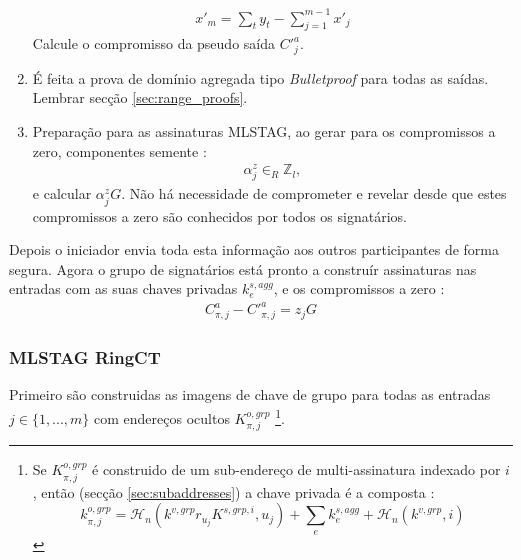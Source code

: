 \begin{enumerate}
\begin{align*}
x'_m = \sum_t y_t - \sum_{j=1}^{m-1} x'_j
\end{align*}
Calcule o compromisso da pseudo saída $C'^a_{j}$.
    \item É feita a prova de domínio agregada tipo {\em Bulletproof} para todas as saídas. Lembrar secção \ref{sec:range_proofs}. 
    \item Preparação para as assinaturas MLSTAG, ao gerar para os compromissos a zero, componentes semente :
\begin{align*}    
\alpha^z_{j} \in_R \mathbb{Z}_l ,
\end{align*}
e calcular $\alpha^z_{j} G$. Não há necessidade de comprometer e revelar desde que estes compromissos a zero são conhecidos por todos os signatários.
\end{enumerate}

Depois o iniciador envia toda esta informação aos outros participantes de forma segura. Agora o grupo de signatários está pronto a construír assinaturas nas entradas com as suas chaves privadas $k^{s,agg}_e$, e os compromissos a zero :
\begin{align*}
C^a_{\pi,j} - C'^a_{\pi,j} = z_j G
\end{align*}


\subsubsection*{MLSTAG RingCT}

Primeiro são construidas as imagens de chave de grupo para todas as entradas $j \in \{1,...,m\}$ com endereços ocultos $K^{o,grp}_{\pi,j}$ \footnote{Se $K^{o,grp}_{\pi,j}$ é construido de um sub-endereço de multi-assinatura indexado por $i$, então (secção \ref{sec:subaddresses}) a chave privada é a composta : 
\[k^{o,grp}_{\pi,j} = \mathcal{H}_n(k^{v,grp} r_{u_j} K^{s,grp,i}, u_j) + \sum_e k^{s,agg}_e + \mathcal{H}_n(k^{v,grp},i)\]}.

